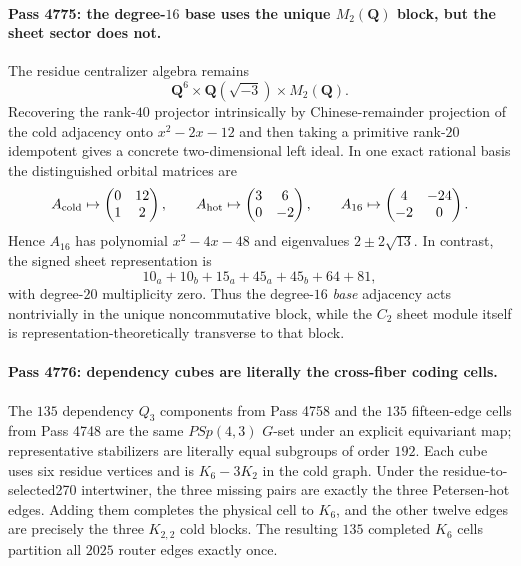 \paragraph{Pass 4775: the degree-$16$ base uses the unique $M_2(\mathbf Q)$ block, but the sheet sector does not.}
The residue centralizer algebra remains
\[
 \mathbf Q^6\times\mathbf Q(\sqrt{-3})\times M_2(\mathbf Q).
\]
Recovering the rank-$40$ projector intrinsically by Chinese-remainder projection of the cold adjacency onto $x^2-2x-12$ and then taking a primitive rank-$20$ idempotent gives a concrete two-dimensional left ideal.  In one exact rational basis the distinguished orbital matrices are
\[
 A_{\rm cold}\mapsto
 \begin{pmatrix}0&12\\1&2\end{pmatrix},\qquad
 A_{\rm hot}\mapsto
 \begin{pmatrix}3&6\\0&-2\end{pmatrix},\qquad
 A_{16}\mapsto
 \begin{pmatrix}4&-24\\-2&0\end{pmatrix}.
\]
Hence $A_{16}$ has polynomial $x^2-4x-48$ and eigenvalues $2\pm2\sqrt{13}$.  In contrast, the signed sheet representation is
\[
 10_a+10_b+15_a+45_a+45_b+64+81,
\]
with degree-$20$ multiplicity zero.  Thus the degree-$16$ \emph{base} adjacency acts nontrivially in the unique noncommutative block, while the $C_2$ sheet module itself is representation-theoretically transverse to that block.

\paragraph{Pass 4776: dependency cubes are literally the cross-fiber coding cells.}
The $135$ dependency $Q_3$ components from Pass 4758 and the $135$ fifteen-edge cells from Pass 4748 are the same $PSp(4,3)$ $G$-set under an explicit equivariant map; representative stabilizers are literally equal subgroups of order $192$.  Each cube uses six residue vertices and is $K_6-3K_2$ in the cold graph.  Under the residue-to-selected270 intertwiner, the three missing pairs are exactly the three Petersen-hot edges.  Adding them completes the physical cell to $K_6$, and the other twelve edges are precisely the three $K_{2,2}$ cold blocks.  The resulting $135$ completed $K_6$ cells partition all $2025$ router edges exactly once.

